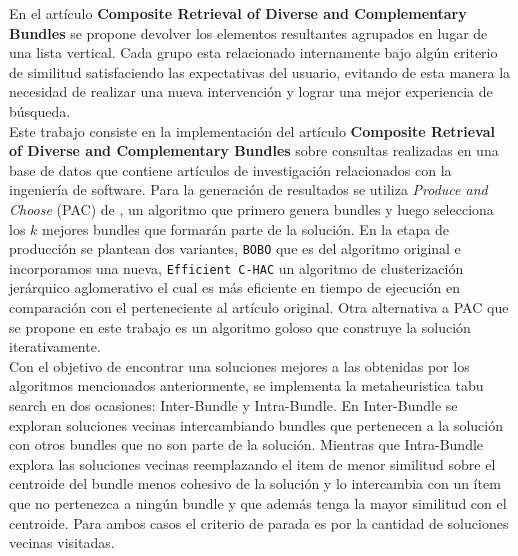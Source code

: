 En el artículo \textbf{Composite Retrieval of Diverse and Complementary Bundles}\cite{compositeRetrival} se propone devolver los elementos resultantes agrupados en lugar de una lista vertical. Cada grupo esta relacionado internamente bajo algún criterio de similitud satisfaciendo las expectativas del usuario, evitando de esta manera la necesidad de realizar una nueva intervención y lograr una mejor experiencia de búsqueda.\\
Este trabajo consiste en la implementación del artículo \textbf{Composite Retrieval of Diverse and Complementary Bundles} sobre consultas realizadas en una base de datos que contiene artículos de investigación relacionados con la ingeniería de software. Para la generación de resultados se utiliza \textit{Produce and Choose} (PAC) de \cite{compositeRetrival}, un algoritmo que primero genera bundles y luego selecciona los $k$ mejores bundles que formarán parte de la solución. En la etapa de producción se plantean dos variantes, \texttt{BOBO} que es del algoritmo original e incorporamos una nueva, \texttt{Efficient C-HAC} un algoritmo de clusterización jerárquico aglomerativo el cual es más eficiente en tiempo de ejecución en comparación con el perteneciente al artículo original. Otra alternativa a PAC que se propone en este trabajo es un algoritmo goloso que construye la solución iterativamente.\\
Con el objetivo de encontrar una soluciones mejores a las obtenidas por los algoritmos mencionados anteriormente, se implementa la metaheuristica tabu search en dos ocasiones: Inter-Bundle y Intra-Bundle. En Inter-Bundle se exploran soluciones vecinas intercambiando bundles que pertenecen a la solución con otros bundles que no son parte de la solución. Mientras que Intra-Bundle explora las soluciones vecinas reemplazando el item de menor similitud sobre el centroide del bundle menos cohesivo de la solución y lo intercambia con un ítem que no pertenezca a ningún bundle y que además tenga la mayor similitud con el centroide. Para ambos casos el criterio de parada es por la cantidad de soluciones vecinas visitadas.\\

